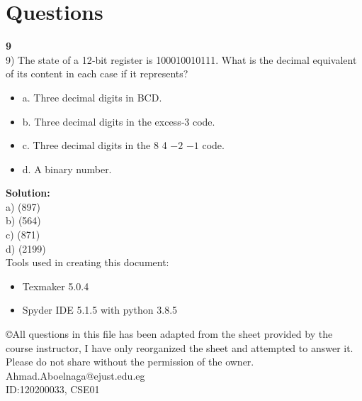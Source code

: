 \documentclass[a4paper,12pt]{extarticle}
\begin{document}
\section*{\LARGE Questions }{\textbf{\LARGE 9}}\\[0.5cm]
 9) The state of a 12‐bit register is 100010010111. What is the decimal equivalent of its content in each case if it represents?
\begin{itemize}
\item a. Three decimal digits in BCD.
\item b. Three decimal digits in the excess‐3 code.
\item c. Three decimal digits in the 8 4 $-2$ $-1$ code.
\item d. A binary number.
\end{itemize}  
{\color{blue}\textbf{Solution:}}\\[0.3cm]
\indent \color{red} a) \color{black}(897)\\[0.2cm]
\indent \color{red} b) \color{black}(564)\\[0.2cm]
\indent \color{red} c) \color{black}(871)\\[0.2cm]
\indent \color{red} d) \color{black}(2199)\\[7.5cm]
Tools used in creating this document:
 \begin{itemize}
 \item Texmaker 5.0.4
 \item Spyder IDE 5.1.5 with python 3.8.5
\end{itemize}  

 \copyright All questions in this file has been adapted from the sheet provided by the course instructor, I have only reorganized the sheet and attempted to answer it. Please do not share without the permission of the owner.\\
\color{blue}Ahmad.Aboelnaga@ejust.edu.eg\\
ID:120200033, CSE01
\end{document}
